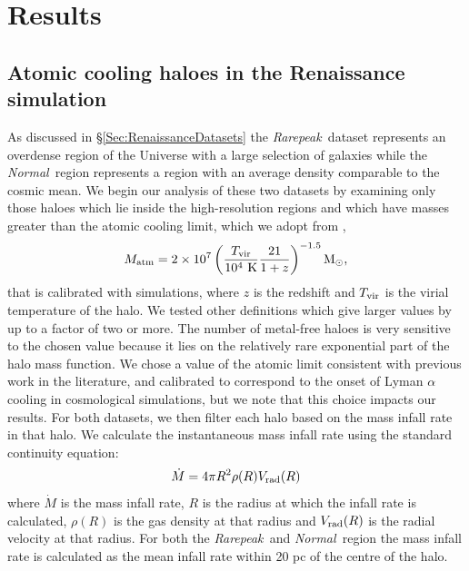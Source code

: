 \documentclass[twocolumn,iop,revtex4]{openjournal}
\newcommand{\rarepeak} {\textit{Rarepeak~}}
\newcommand{\normal} {\textit{Normal~}}
\begin{document}
\section{Results} \label{Sec:Results}

\subsection{Atomic cooling haloes in the Renaissance simulation}

As discussed in \S \ref{Sec:RenaissanceDatasets} the \rarepeak dataset represents an overdense
region of the Universe with a large selection of galaxies while the \normal region represents a
region with an average density comparable to the cosmic mean. We begin our analysis of these two
datasets by examining only those haloes which lie inside the high-resolution regions and which
have masses greater than the atomic cooling limit, which we adopt from \cite{Fernandez_2014},
%
\begin{equation}
  M_{\rm atm} = 2 \times 10^{7} \left( \frac{{T_{\rm vir}}}{10^4~{\rm K}}  \frac{21}{1+z} \right)^{-1.5} \rm{M_{\odot}},
\end{equation}
%
that is calibrated with simulations, where $z$ is the redshift and $T_{\rm vir}$ is the virial temperature of the halo. 
We tested other definitions \citep[e.g.][]{Bromm_2011} which give larger
values by up to a factor of two or more. The number of metal-free haloes
is very sensitive to the chosen value because it lies on the 
relatively rare
exponential part of the halo mass function.
We chose a value of the atomic limit consistent with previous work in the literature, and
calibrated to correspond to the onset of Lyman $\alpha$ cooling in cosmological simulations,
but we note that this choice impacts our results.
For both datasets, we then filter each halo based on the mass infall rate in that halo.
We calculate the instantaneous mass infall rate using the standard continuity equation:
\begin{equation}  
  \dot{M} = 4 \pi R^2 \rho(R) V_{\rm rad}(R)
\end{equation}
where $\dot{M}$ is the mass infall rate, $R$ is the radius at which the infall rate is calculated,
$\rho(R)$ is the gas density at that radius and $V_{\rm rad}(R)$ is the radial velocity at that radius.
For both the \rarepeak and \normal region the mass infall rate is calculated as the mean
infall rate within 20 pc of the centre of the halo. 
\end{document}
